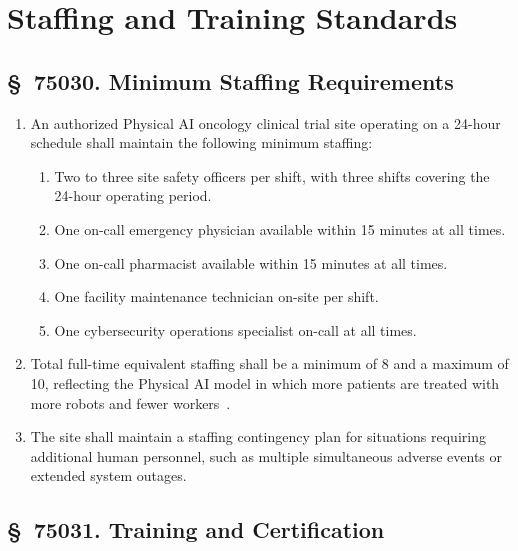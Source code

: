 \documentclass[11pt,letterpaper]{article}
\begin{document}
\section{Staffing and Training Standards}

\subsection{\S~75030. Minimum Staffing Requirements}

\begin{enumerate}[label=(\alph*)]
\item An authorized Physical AI oncology clinical trial site operating on a
  24-hour schedule shall maintain the following minimum staffing:
  \begin{enumerate}[label=(\arabic*)]
  \item Two to three site safety officers per shift, with three shifts covering
    the 24-hour operating period.
  \item One on-call emergency physician available within 15 minutes at all
    times.
  \item One on-call pharmacist available within 15 minutes at all times.
  \item One facility maintenance technician on-site per shift.
  \item One cybersecurity operations specialist on-call at all times.
  \end{enumerate}

\item Total full-time equivalent staffing shall be a minimum of 8 and a maximum
  of 10, reflecting the Physical AI model in which more patients are treated
  with more robots and fewer workers~\cite{sitespec2026}.

\item The site shall maintain a staffing contingency plan for situations
  requiring additional human personnel, such as multiple simultaneous
  adverse events or extended system outages.
\end{enumerate}

\subsection{\S~75031. Training and Certification}
\end{document}

